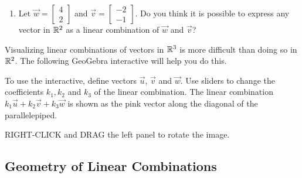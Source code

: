 \documentclass{ximera}
\begin{document}
\begin{exploration}
\begin{enumerate}
\item Let $\vec{w}=\begin{bmatrix}4\\2\end{bmatrix}$ and $\vec{v}=\begin{bmatrix}-2\\-1\end{bmatrix}$.  Do you think it is possible to express any vector in $\mathbb{R}^2$ as a linear combination of $\vec{w}$ and $\vec{v}$?  
\end{enumerate}
    
\end{exploration}
Visualizing linear combinations of vectors in $\mathbb{R}^3$ is more difficult than doing so in $\mathbb{R}^2$.  The following GeoGebra interactive will help you do this.

\begin{exploration}\label{exp:linCombR3}
To use the interactive, define vectors $\vec{u}$, $\vec{v}$ and $\vec{w}$.  Use sliders to change the coefficients $k_1, k_2$ and $k_3$ of the linear combination.  The linear combination $k_1\vec{u}+k_2\vec{v}+k_3\vec{w}$ is shown as the pink vector along the diagonal of the parallelepiped. 

RIGHT-CLICK and DRAG the left panel to rotate the image.
\begin{center} 
\end{center}
\end{exploration}

\subsection*{Geometry of Linear Combinations}
\end{document}

